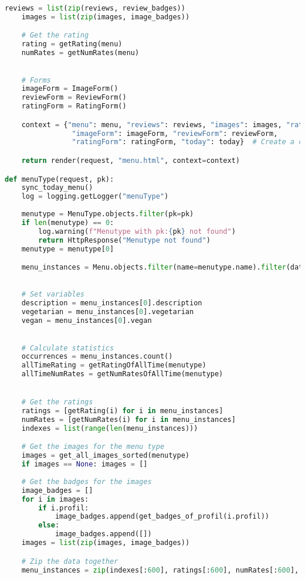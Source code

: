 \begin{lstlisting}[language=Python]
    reviews = list(zip(reviews, review_badges))
    images = list(zip(images, image_badges))

    # Get the rating
    rating = getRating(menu)
    numRates = getNumRates(menu)
    

    # Forms
    imageForm = ImageForm()
    reviewForm = ReviewForm()
    ratingForm = RatingForm()

    context = {"menu": menu, "reviews": reviews, "images": images, "rating": rating, "numRates": numRates,
                "imageForm": imageForm, "reviewForm": reviewForm,
                "ratingForm": ratingForm, "today": today}  # Create a context dictionary to pass to the template

    return render(request, "menu.html", context=context)

def menuType(request, pk):
    sync_today_menu()
    log = logging.getLogger("menuType")
    
    menutype = MenuType.objects.filter(pk=pk)
    if len(menutype) == 0:
        log.warning(f"Menutype with pk:{pk} not found")
        return HttpResponse("Menutype not found")
    menutype = menutype[0]

    menu_instances = Menu.objects.filter(name=menutype.name).filter(date__lte=dt.date.today()).order_by("-date")
    

    # Set variables
    description = menu_instances[0].description
    vegetarian = menu_instances[0].vegetarian
    vegan = menu_instances[0].vegan

    
    # Calculate statistics
    occurrences = menu_instances.count()
    allTimeRating = getRatingOfAllTime(menutype)
    allTimeNumRates = getNumRatesOfAllTime(menutype)


    # Get the ratings
    ratings = [getRating(i) for i in menu_instances]
    numRates = [getNumRates(i) for i in menu_instances]
    indexes = list(range(len(menu_instances)))

    # Get the images for the menu type
    images = get_all_images_sorted(menutype)
    if images == None: images = []
    
    # Get the badges for the images
    image_badges = []
    for i in images:
        if i.profil:
            image_badges.append(get_badges_of_profil(i.profil))
        else:
            image_badges.append([])
    images = list(zip(images, image_badges))

    # Zip the data together
    menu_instances = zip(indexes[:600], ratings[:600], numRates[:600], menu_instances[:600])


\end{lstlisting}
